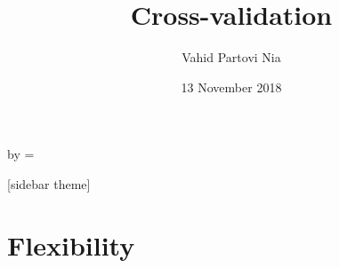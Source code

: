 

\usepackage{listings}
\usepackage{xcolor}
\def \y {\mathbf y}
\def \X {\mathbf X}
\def \A {\mathbf A}
\def \t {^\top}
\def \inv {^ {-1}}
\def \x {\mathbf x}
\def \bbeta {\boldsymbol \beta}
\def \eeps {\boldsymbol \varepsilon}
\def \TV {\mathrm{TV}}
\def \Radio {\mathrm{Radio}}
\def \Newspaper {\mathrm{Newspaper}}
\def \Sales {\mathrm{Sales}}
\def \Balance {\mathrm{Balance}}
\def \Default {\mathrm{Default}}



\title[]{Cross-validation}   
\author[]{Vahid Partovi Nia} 
\date{13 November 2018}


\makeatletter
  \begin{frame}[plain]
    \hspace*{-\beamer@leftsidebar}%
    \advance\textwidth by \beamer@leftsidebar\relax
    \beamer@leftsidebar=\z@
    \begin{minipage}{\textwidth}\par%
      \maketitle
    \end{minipage}
  \end{frame}
  \makeatother




[sidebar theme]


\section{Flexibility}





